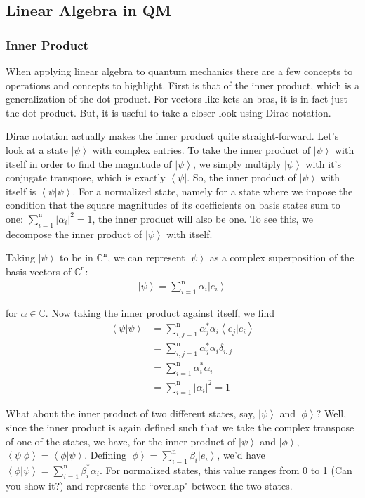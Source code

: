 \documentclass[11pt]{article} %
\newcommand{\bra}[1]{\left\langle #1 \right|}
\newcommand{\ket}[1]{\left|#1\right\rangle}
\newcommand{\braket}[2]{\left\langle#1 |  #2\right\rangle}
\begin{document}
\subsection{Linear Algebra in QM}
\subsubsection{Inner Product} \label{inner_prod}
When applying linear algebra to quantum mechanics there are a few concepts to operations and concepts to highlight. First is that of the inner product, which is a generalization of the dot product. For vectors like kets an bras, it is in fact just the dot product. But, it is useful to take a closer look using Dirac notation.

Dirac notation actually makes the inner product quite straight-forward. Let's look at a state $\ket{\psi}$ with complex entries. To take the inner product of $\ket{\psi}$ with itself in order to find the magnitude of $\ket{\psi}$, we simply multiply $\ket{\psi}$ with it's conjugate transpose, which is exactly $\bra{\psi}$. So, the inner product of $\ket{\psi}$ with itself is $\braket{\psi}{\psi}$. For a normalized state, namely for a state where we impose the condition that the square magnitudes of its coefficients on basis states sum to one: $\sum^\textrm{n}_{i=1}\left|\alpha_i\right|^2=1$, the inner product will also be one. To see this, we decompose the inner product of $\ket{\psi}$ with itself.

Taking $\ket{\psi}$ to be in $\mathbb{C}^\textrm{n}$, we can represent $\ket{\psi}$ as a complex superposition of the basis vectors of $\mathbb{C}^\textrm{n}$:
\begin{align}
    \ket{\psi} = \sum^\textrm{n}_{i=1}\alpha_i\ket{e_i} \nonumber
\end{align}

\noindent for $\alpha \in \mathbb{C}$. Now taking the inner product against itself, we find
\begin{align}
    \braket{\psi}{\psi} &= \sum^\textrm{n}_{i,j=1}\alpha_j^\ast\alpha_i\braket{e_j}{e_i}\nonumber\\
    &= \sum^\textrm{n}_{i,j=1}\alpha_j^\ast\alpha_i\delta_{i,j}\nonumber\\
    &= \sum^\textrm{n}_{i=1}\alpha_i^\ast\alpha_i\nonumber\\
    &= \sum^\textrm{n}_{i=1}\left|\alpha_i\right|^2 = 1\nonumber
\end{align}

What about the inner product of two different states, say, $\ket{\psi}$ and $\ket{\phi}$? Well, since the inner product is again defined such that we take the complex transpose of one of the states, we have, for the inner product of $\ket{\psi}$ and $\ket{\phi}$, $\braket{\psi}{\phi} = \braket{\phi}{\psi}$. Defining $\ket{\phi} = \sum^\textrm{n}_{i=1}\beta_i\ket{e_i}$, we'd have $\braket{\phi}{\psi} = \sum^\textrm{n}_{i=1}\beta_i^\ast\alpha_i$. For normalized states, this value ranges from 0 to 1 (Can you show it?) and represents the ``overlap" between the two states.
\end{document}
